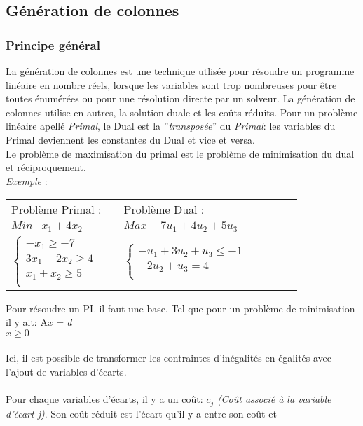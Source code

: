 \subsection{Génération de colonnes}
\subsubsection{Principe général}
La génération de colonnes est une technique utlisée pour résoudre un programme linéaire en nombre réels, lorsque les variables sont trop nombreuses pour être toutes énumérées ou pour une résolution directe par un solveur. La génération de colonnes utilise en autres, la solution duale et les coûts réduits. \cite{introBCBP}
Pour un problème linéaire apellé \textit{Primal}, le Dual est la ''\textit{transposée}'' du \textit{Primal}: les variables du Primal deviennent les constantes du Dual et vice et versa. \\
Le problème de maximisation du primal est le problème de minimisation du dual et réciproquement.
\newline
\\
\underline{\textit{Exemple}} : 
\\


\begin{tabular}{ l p{5 cm}l p{5 cm}  l p{5 cm} l}
Problème Primal : & & 
Problème Dual : \\

$Min{ - x_1 + 4x_2}$ & &  $Max -7\textit{u}_1 + 4\textit{u}_2 + 5\textit{u}_3$\\ 


$\left\lbrace
\begin{array}{l}
-x_1\geq -7\\
3x_1-2x_2 \geq 4\\
x_1+x_2 \geq 5\\
\end{array}
\right.$ 
& & 
$\left\lbrace
\begin{array}{l}
-\textit{u}_1 + 3\textit{u}_2 + \textit{u}_3 \leq -1 \\
-2\textit{u}_2 + \textit{u}_3 = 4 \\
\end{array}
\right.$
\end{tabular}



Pour résoudre un PL il faut une base. Tel que pour un problème de minimisation il y ait:
\newline
\newline
\hspace{2.5cm} A\textit{x = d} 
\\
\hspace{2.5cm}\textit{ $x \geq 0$}
\\
\\
Ici, il est possible de transformer les contraintes d'inégalités en égalités avec l'ajout de variables d'écarts. \\ \\ 
Pour chaque variables d'écarts, il y a un coût: \textit{$c_j$} \textit{(Coût associé à la variable d'écart j)}. 
Son coût réduit est l'écart qu'il y a entre son coût et 